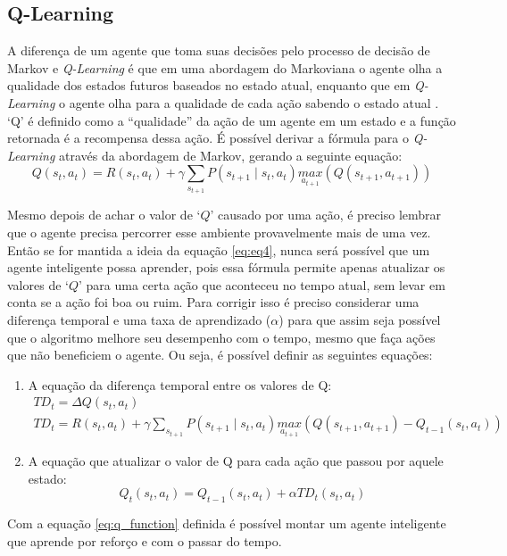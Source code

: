 \subsection{Q-Learning}

A diferença de um agente que toma suas decisões pelo processo de decisão de Markov e \textit{Q-Learning} é que em uma abordagem do Markoviana o agente olha a qualidade dos estados futuros baseados no estado atual, enquanto que em \textit{Q-Learning} o agente olha para a qualidade de cada ação sabendo o estado atual \cite{watkins1992q}. 
‘Q’ é definido como a “qualidade” da ação de um agente em um estado e a função retornada é a recompensa dessa ação. É possível derivar a fórmula para o \textit{Q-Learning} através da abordagem de Markov, gerando a seguinte equação:
\begin{equation}
    Q( s_{t}, a_t ) = R(s_t,a_{t}) + \gamma \sum_{s_{t+1}} P( s_{t+1} \mid {s_t,a_t} ) \underset{a_{t+1}}{max} (Q(s_{t+1}, a_{t+1}))
    \label{eq:eq4}
\end{equation}

Mesmo depois de achar o valor de `$Q$' causado por uma ação, é preciso lembrar que o agente precisa percorrer esse ambiente provavelmente mais de uma vez. 
Então se for mantida a ideia da equação \ref{eq:eq4}, nunca será possível que um agente inteligente possa aprender, pois essa fórmula permite apenas atualizar os valores de `$Q$' para uma certa ação que aconteceu no tempo atual, sem levar em conta se a ação foi boa ou ruim.
Para corrigir isso é preciso considerar uma diferença temporal e uma taxa de aprendizado ($\alpha$) para que assim seja possível que o algoritmo melhore seu desempenho com o tempo, mesmo que faça ações que não beneficiem o agente. 
Ou seja, é possível definir as seguintes equações:

\begin{enumerate}
    \item A equação da diferença temporal entre os valores de Q:
    \begin{gather}
        TD_t = \Delta Q( s_t,a_t )\\
        TD_t = R(s_t,a_{t}) + \gamma \sum_{s_{t+1}} P( s_{t+1} \mid {s_t,a_t} ) \underset{a_{t+1}}{max} (Q(s_{t+1}, a_{t+1}) - Q_{t-1}(s_{t}, a_{t}))
    \end{gather}
    
    \item A equação que atualizar o valor de Q para cada ação que passou por aquele estado:
    \begin{equation}
        Q_t ( s_t,a_t ) = Q_{ t-1 }( s_t,a_t )+ \alpha TD_t( s_t,a_t )
        \label{eq:q_function}
    \end{equation}
\end{enumerate}

Com a equação \ref{eq:q_function} definida é possível montar um agente inteligente que aprende por reforço e com o passar do tempo.